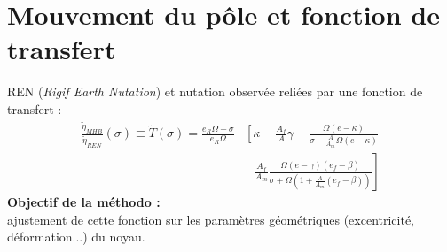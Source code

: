 \section{Mouvement du pôle et fonction de transfert}

\begin{frame}
   REN (\textit{Rigif Earth Nutation}) et nutation observée reliées par une fonction de transfert :
   \begin{align*}
     \frac{\tilde{\eta}_{MHB}}{\tilde{\eta}_{REN}}(\sigma) 
     \equiv \tilde{T}(\sigma) 
     = \frac{e_R\Omega-\sigma}{e_R\Omega} &\left[ \kappa - \frac{A_f}{A}\gamma\right.- \frac{\Omega(e-\kappa)}{\sigma-\frac{A}{A_m}\Omega(e-\kappa)}\\
     &-\left. \frac{A_f}{A_m} \frac{\Omega (e-\gamma)(e_f-\beta)}{\sigma + \Omega(1+ \frac{A}{A_m}(e_f-\beta))}\right]
   \end{align*}
   	 \textbf{Objectif de la méthodo :} 
   	\\ajustement de cette fonction sur les paramètres géométriques (excentricité, déformation...) du noyau. 
\end{frame}


\begin{frame}
  \frtt{}
\end{frame}



